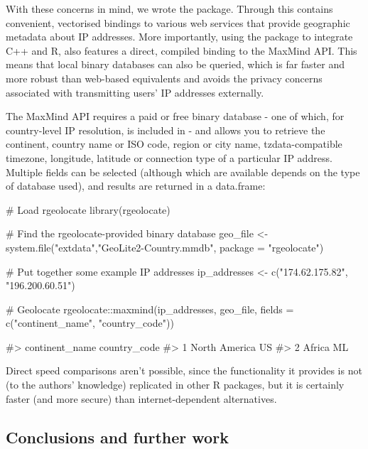 With these concerns in mind, we wrote the  package.
Through  this contains convenient, vectorised bindings to
various web services that provide geographic metadata about IP
addresses. More importantly, using the  package to
integrate C++ and R,  also features a direct, compiled
binding to the MaxMind API. This means that local binary databases can
also be queried, which is far faster and more robust than web-based
equivalents and avoids the privacy concerns associated with transmitting
users' IP addresses externally.

The MaxMind API requires a paid or free binary database - one of which,
for country-level IP resolution, is included in  - and
allows you to retrieve the continent, country name or ISO code, region
or city name, tzdata-compatible timezone, longitude, latitude or
connection type of a particular IP address. Multiple fields can be
selected (although which are available depends on the type of database
used), and results are returned in a data.frame:

\begin{Schunk}
\begin{Sinput}
# Load rgeolocate
library(rgeolocate)

# Find the rgeolocate-provided binary database
geo_file <- system.file("extdata","GeoLite2-Country.mmdb", package = "rgeolocate")

# Put together some example IP addresses
ip_addresses <- c("174.62.175.82", "196.200.60.51")

# Geolocate
rgeolocate::maxmind(ip_addresses, geo_file, fields = c("continent_name", "country_code"))
\end{Sinput}
\begin{Soutput}
#>   continent_name country_code
#> 1  North America           US
#> 2         Africa           ML
\end{Soutput}
\end{Schunk}

Direct speed comparisons aren't possible, since the functionality it
provides is not (to the authors' knowledge) replicated in other R
packages, but it is certainly faster (and more secure) than
internet-dependent alternatives.

\subsection{Conclusions and further
work}\label{conclusions-and-further-work}

